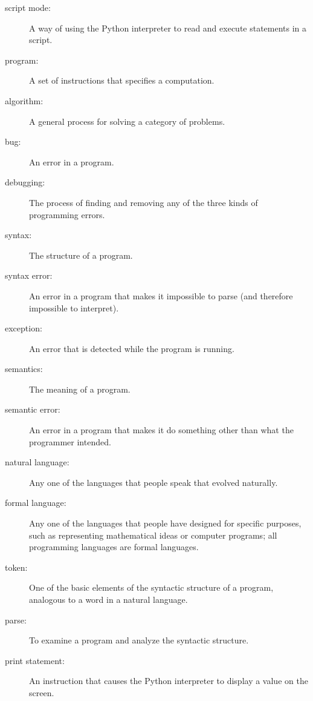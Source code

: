 \documentclass[10pt]{book}
\begin{document}
\begin{description}
\item[script mode:] A way of using the Python interpreter to read
and execute statements in a script.

\item[program:] A set of instructions that specifies a computation.

\item[algorithm:]  A general process for solving a category of
problems.

\item[bug:]  An error in a program.

\item[debugging:]  The process of finding and removing any of the
three kinds of programming errors.

\item[syntax:]  The structure of a program.

\item[syntax error:]  An error in a program that makes it impossible
to parse (and therefore impossible to interpret).

\item[exception:]  An error that is detected while the program is running.

\item[semantics:]  The meaning of a program.

\item[semantic error:]   An error in a program that makes it do something
other than what the programmer intended.

\item[natural language:]  Any one of the languages that people speak that
evolved naturally.

\item[formal language:]  Any one of the languages that people have designed
for specific purposes, such as representing mathematical ideas or
computer programs; all programming languages are formal languages.

\item[token:]  One of the basic elements of the syntactic structure of
a program, analogous to a word in a natural language.

\item[parse:]  To examine a program and analyze the syntactic structure.

\item[print statement:]  An instruction that causes the Python
interpreter to display a value on the screen.


\end{description}
\end{document}
